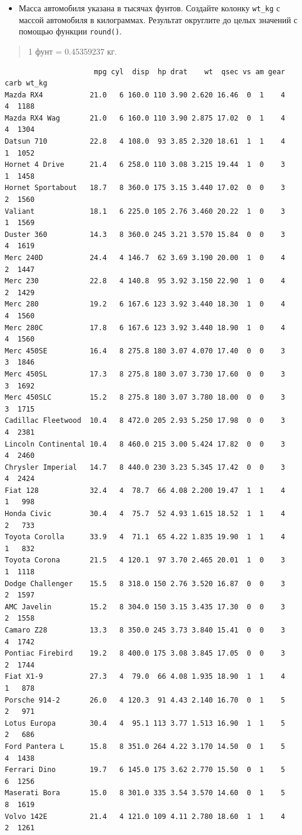 \documentclass[
]{book}
\providecommand{\tightlist}{%
  \setlength{\itemsep}{0pt}\setlength{\parskip}{0pt}}
\begin{document}
\begin{itemize}
\tightlist
\item
  Масса автомобиля указана в тысячах фунтов. Создайте колонку \texttt{wt\_kg} с массой автомобиля в килограммах. Результат округлите до целых значений с помощью функции \texttt{round()}.
\end{itemize}

\begin{quote}
1 фунт = 0.45359237 кг.
\end{quote}

\begin{verbatim}
                     mpg cyl  disp  hp drat    wt  qsec vs am gear carb wt_kg
Mazda RX4           21.0   6 160.0 110 3.90 2.620 16.46  0  1    4    4  1188
Mazda RX4 Wag       21.0   6 160.0 110 3.90 2.875 17.02  0  1    4    4  1304
Datsun 710          22.8   4 108.0  93 3.85 2.320 18.61  1  1    4    1  1052
Hornet 4 Drive      21.4   6 258.0 110 3.08 3.215 19.44  1  0    3    1  1458
Hornet Sportabout   18.7   8 360.0 175 3.15 3.440 17.02  0  0    3    2  1560
Valiant             18.1   6 225.0 105 2.76 3.460 20.22  1  0    3    1  1569
Duster 360          14.3   8 360.0 245 3.21 3.570 15.84  0  0    3    4  1619
Merc 240D           24.4   4 146.7  62 3.69 3.190 20.00  1  0    4    2  1447
Merc 230            22.8   4 140.8  95 3.92 3.150 22.90  1  0    4    2  1429
Merc 280            19.2   6 167.6 123 3.92 3.440 18.30  1  0    4    4  1560
Merc 280C           17.8   6 167.6 123 3.92 3.440 18.90  1  0    4    4  1560
Merc 450SE          16.4   8 275.8 180 3.07 4.070 17.40  0  0    3    3  1846
Merc 450SL          17.3   8 275.8 180 3.07 3.730 17.60  0  0    3    3  1692
Merc 450SLC         15.2   8 275.8 180 3.07 3.780 18.00  0  0    3    3  1715
Cadillac Fleetwood  10.4   8 472.0 205 2.93 5.250 17.98  0  0    3    4  2381
Lincoln Continental 10.4   8 460.0 215 3.00 5.424 17.82  0  0    3    4  2460
Chrysler Imperial   14.7   8 440.0 230 3.23 5.345 17.42  0  0    3    4  2424
Fiat 128            32.4   4  78.7  66 4.08 2.200 19.47  1  1    4    1   998
Honda Civic         30.4   4  75.7  52 4.93 1.615 18.52  1  1    4    2   733
Toyota Corolla      33.9   4  71.1  65 4.22 1.835 19.90  1  1    4    1   832
Toyota Corona       21.5   4 120.1  97 3.70 2.465 20.01  1  0    3    1  1118
Dodge Challenger    15.5   8 318.0 150 2.76 3.520 16.87  0  0    3    2  1597
AMC Javelin         15.2   8 304.0 150 3.15 3.435 17.30  0  0    3    2  1558
Camaro Z28          13.3   8 350.0 245 3.73 3.840 15.41  0  0    3    4  1742
Pontiac Firebird    19.2   8 400.0 175 3.08 3.845 17.05  0  0    3    2  1744
Fiat X1-9           27.3   4  79.0  66 4.08 1.935 18.90  1  1    4    1   878
Porsche 914-2       26.0   4 120.3  91 4.43 2.140 16.70  0  1    5    2   971
Lotus Europa        30.4   4  95.1 113 3.77 1.513 16.90  1  1    5    2   686
Ford Pantera L      15.8   8 351.0 264 4.22 3.170 14.50  0  1    5    4  1438
Ferrari Dino        19.7   6 145.0 175 3.62 2.770 15.50  0  1    5    6  1256
Maserati Bora       15.0   8 301.0 335 3.54 3.570 14.60  0  1    5    8  1619
Volvo 142E          21.4   4 121.0 109 4.11 2.780 18.60  1  1    4    2  1261
\end{verbatim}
\end{document}
